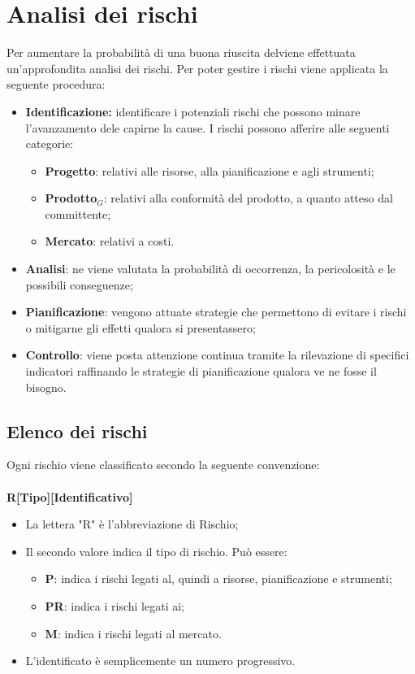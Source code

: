 \chapter{Analisi dei rischi}
Per aumentare la probabilità di una buona riuscita delviene effettuata un'approfondita analisi dei rischi. Per poter gestire i rischi viene applicata la seguente procedura:
\begin{itemize}
	\item \textbf{Identificazione:} identificare i potenziali rischi che possono minare l'avanzamento dele capirne la cause. I rischi possono afferire alle seguenti categorie:
	\begin{itemize}
		\item \textbf{Progetto}: relativi alle risorse, alla pianificazione e agli strumenti;
		\item \textbf{Prodotto$_{G}$}: relativi alla conformità del prodotto, a quanto atteso dal committente;
		\item \textbf{Mercato}: relativi a costi.
	\end{itemize}
	\item \textbf{Analisi}: ne viene valutata la probabilità di occorrenza, la pericolosità e le possibili conseguenze;
	\item \textbf{Pianificazione}: vengono attuate strategie che permettono di evitare i rischi o mitigarne gli effetti qualora si presentassero;
	\item \textbf{Controllo}: viene posta attenzione continua tramite la rilevazione di specifici indicatori raffinando le strategie di pianificazione qualora ve ne fosse il bisogno.
\end{itemize}
\section{Elenco dei rischi}
Ogni rischio viene classificato secondo la seguente convenzione:\\\\
\centering \textbf{R[Tipo][Identificativo]}\\
\begin{itemize}
	\item La lettera "R" è l'abbreviazione di Rischio;
	\item Il secondo valore indica il tipo di rischio. Può essere:
	\begin{itemize}
		\item \textbf{P}: indica i rischi legati al, quindi a risorse, pianificazione e strumenti;
		\item \textbf{PR}: indica i rischi legati ai;
		\item \textbf{M}: indica i rischi legati al mercato.
	\end{itemize}
	\item L'identificato è semplicemente un numero progressivo.
\end{itemize}

